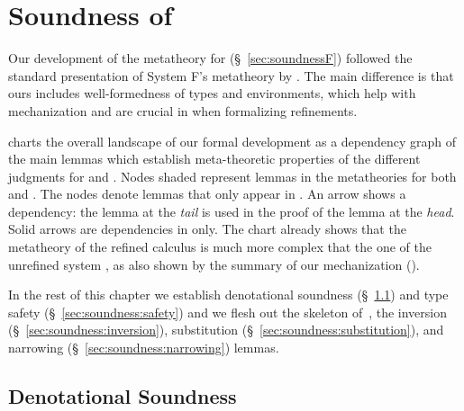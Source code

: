 \chapter{Soundness of \sysrf} 
\label{ch:soundness}





Our development of the metatheory 
for \sysf (\S~\ref{sec:soundnessF})
followed the standard presentation of System F's
metatheory by \citet{TAPL}.
%
The main difference 
is that ours includes well-formedness of types and
environments, which help with mechanization \cite{Remy21}
and are crucial in \sysrf when formalizing refinements.
%

%
%
 charts the overall
landscape of our formal development as a
dependency graph of the main lemmas which
establish meta-theoretic properties of the
different judgments for \sysf and \sysrf.
%
Nodes shaded \colboth represent lemmas
in the metatheories for both \sysf and \sysrf.
%
The \colref nodes denote lemmas
that only appear in %
\sysrf.
%
An arrow shows a dependency: the lemma at the
\emph{tail} is used in the proof of the lemma at
the \emph{head}. %
Solid arrows are dependencies in \sysrf only.
The chart already shows that the metatheory of 
the refined calculus \sysrf is much more complex 
that the one of the unrefined system \sysf, 
as also shown by the summary 
of our mechanization ().

In the rest of this chapter
we establish 
denotational soundness (\S~\ref{sec:soundness:denotational}) and 
type safety (\S~\ref{sec:soundness:safety})
and we flesh out the skeleton of~, \ie  
the inversion (\S~\ref{sec:soundness:inversion}),
substitution (\S~\ref{sec:soundness:substitution}),
and narrowing (\S~\ref{sec:soundness:narrowing}) lemmas.





\section{Denotational Soundness}
\label{sec:soundness:denotational}
\label{sec:denot:soundness}

